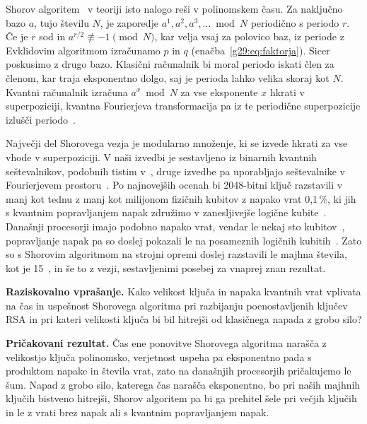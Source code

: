 Shorov algoritem~\cite{shor1997} v teoriji isto nalogo reši v polinomskem času. Za naključno bazo $a$, tujo številu $N$, je zaporedje $a^1, a^2, a^3, \dots \bmod N$ periodično s periodo $r$. Če je $r$ sod in $a^{r/2} \not\equiv -1 \pmod N$, kar velja vsaj za polovico baz, iz periode z Evklidovim algoritmom izračunamo $p$ in $q$ (enačba~\eqref{g29:eq:faktorja}). Sicer poskusimo z drugo bazo. Klasični računalnik bi moral periodo iskati člen za členom, kar traja eksponentno dolgo, saj je perioda lahko velika skoraj kot $N$. Kvantni računalnik izračuna $a^x \bmod N$ za vse eksponente $x$ hkrati v superpoziciji, kvantna Fourierjeva transformacija pa iz te periodične superpozicije izlušči periodo~\cite{nielsen2010}.

Največji del Shorovega vezja je modularno množenje, ki se izvede hkrati za vse vhode v superpoziciji. V naši izvedbi je sestavljeno iz binarnih kvantnih seštevalnikov, podobnih tistim v~\cite{g29:vedral1996}, druge izvedbe pa uporabljajo seštevalnike v Fourierjevem prostoru~\cite{g29:draper2000,g29:beauregard2003}. Po najnovejših ocenah bi 2048-bitni ključ razstavili v manj kot tednu z manj kot milijonom fizičnih kubitov z napako vrat 0,1\,\%, ki jih s kvantnim popravljanjem napak združimo v zanesljivejše logične kubite~\cite{g29:gidney2025}. Današnji procesorji imajo podobno napako vrat, vendar le nekaj sto kubitov~\cite{preskill2018}, popravljanje napak pa so doslej pokazali le na posameznih logičnih kubitih~\cite{google2025below}. Zato so s Shorovim algoritmom na strojni opremi doslej razstavili le majhna števila, kot je 15~\cite{g29:vandersypen2001,g29:monz2016}, in še to z vezji, sestavljenimi posebej za vnaprej znan rezultat. 

\begin{svgraybox}
\textbf{Raziskovalno vprašanje.} Kako velikost ključa in napaka kvantnih vrat vplivata na čas in uspešnost Shorovega algoritma pri razbijanju poenostavljenih ključev RSA in pri kateri velikosti ključa bi bil hitrejši od klasičnega napada z grobo silo?

\textbf{Pričakovani rezultat.} Čas ene ponovitve Shorovega algoritma narašča z velikostjo ključa polinomsko, verjetnost uspeha pa eksponentno pada s produktom napake in števila vrat, zato na današnjih procesorjih pričakujemo le šum. Napad z grobo silo, katerega čas narašča eksponentno, bo pri naših majhnih ključih bistveno hitrejši, Shorov algoritem pa bi ga prehitel šele pri večjih ključih in le z vrati brez napak ali s kvantnim popravljanjem napak.
\end{svgraybox}


